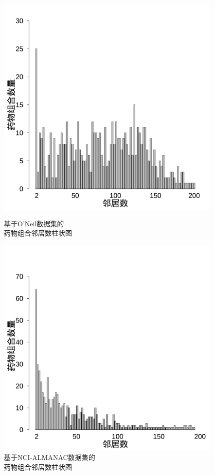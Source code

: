 \begin{figure}[H]
\centering
  \begin{minipage}{0.45\linewidth}
    \centering
    \includegraphics[width=\textwidth]{figures/m_barplot.pdf}
    \caption{基于O'Neil数据集的\\药物组合邻居数柱状图\label{fig:md}}
  \end{minipage}
  \begin{minipage}{0.45\linewidth}
    \centering
    \includegraphics[width=\textwidth]{figures/n_barplot.pdf}
    \caption{基于NCI-ALMANAC数据集的\\药物组合邻居数柱状图\label{fig:nd}}
  \end{minipage}
\end{figure}

